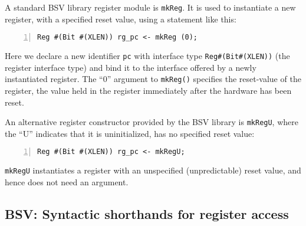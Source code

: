 


A standard BSV library register module is \verb|mkReg|.  It is used to
instantiate a new register, with a specified reset value, using a
statement like this:


{\small
\begin{Verbatim}[frame=single, numbers=left]
    Reg #(Bit #(XLEN)) rg_pc <- mkReg (0);
\end{Verbatim}
}

Here we declare a new identifier \verb|pc| with interface type
\verb|Reg#(Bit#(XLEN))| (the register interface type) and bind it to
the interface offered by a newly instantiated register.  The ``0''
argument to \verb|mkReg()| specifies the reset-value of the register,
{\ie} the value held in the register immediately after the hardware
has been reset.

An alternative register constructor provided by the BSV library is
{\tt mkRegU}, where the ``U'' indicates that it is uninitialized,
{\ie} has no specified reset value:


{\small
\begin{Verbatim}[frame=single, numbers=left]
   Reg #(Bit #(XLEN)) rg_pc <- mkRegU;
\end{Verbatim}
}

\verb|mkRegU| instantiates a register with an unspecified
(unpredictable) reset value, and hence does not need an argument.


\subsection{BSV: Syntactic shorthands for register access}

\label{Sec_Register_syntactic_shorthands}


